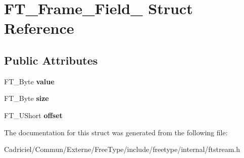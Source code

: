 \hypertarget{struct_f_t___frame___field__}{\section{F\-T\-\_\-\-Frame\-\_\-\-Field\-\_\- Struct Reference}
\label{struct_f_t___frame___field__}
}
\subsection*{Public Attributes}
\begin{DoxyCompactItemize}
\item 
\hypertarget{struct_f_t___frame___field___a10f91dcdd0a582727b67ad45d42bab41}{F\-T\-\_\-\-Byte {\bfseries value}}\label{struct_f_t___frame___field___a10f91dcdd0a582727b67ad45d42bab41}

\item 
\hypertarget{struct_f_t___frame___field___a47e6fbcb90c079421d9d9b64f63a587e}{F\-T\-\_\-\-Byte {\bfseries size}}\label{struct_f_t___frame___field___a47e6fbcb90c079421d9d9b64f63a587e}

\item 
\hypertarget{struct_f_t___frame___field___a85c3275fbb7044f7d6880020b6f0f794}{F\-T\-\_\-\-U\-Short {\bfseries offset}}\label{struct_f_t___frame___field___a85c3275fbb7044f7d6880020b6f0f794}

\end{DoxyCompactItemize}


The documentation for this struct was generated from the following file\-:\begin{DoxyCompactItemize}
\item 
Cadriciel/\-Commun/\-Externe/\-Free\-Type/include/freetype/internal/ftstream.\-h\end{DoxyCompactItemize}
